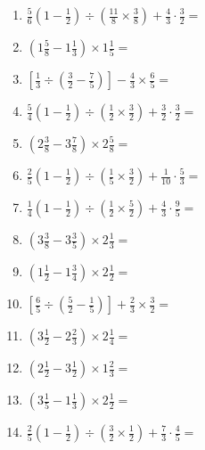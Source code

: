 \documentclass[12pt]{article}
\begin{document}
\begin{enumerate}[ itemsep=1.5cm]
	\item $\displaystyle \frac{5}{6} \left( 1 - \frac{1}{2} \right) \div \left( \frac{11}{8} \times \frac{3}{8} \right) + \frac{4}{3} \cdot \frac{3}{2} =$
	\item $\displaystyle \left( 1 \frac{5}{8} - 1 \frac{1}{3} \right) \times 1 \frac{1}{5} =$
	\item $\displaystyle \left[ \frac{1}{3} \div \left( \frac{3}{2} - \frac{7}{5} \right) \right] - \frac{4}{3} \times \frac{6}{5} =$
	\item $\displaystyle \frac{5}{4} \left( 1 - \frac{1}{2} \right) \div \left( \frac{1}{2} \times \frac{3}{2} \right) + \frac{3}{2} \cdot \frac{3}{2} =$
	\item $\displaystyle \left( 2 \frac{3}{8} - 3 \frac{7}{8} \right) \times 2 \frac{5}{8} =$
	\item $\displaystyle \frac{2}{5} \left( 1 - \frac{1}{2} \right) \div \left( \frac{1}{5} \times \frac{3}{2} \right) + \frac{1}{10} \cdot \frac{5}{3} =$
	\item $\displaystyle \frac{1}{4} \left( 1 - \frac{1}{2} \right) \div \left( \frac{1}{2} \times \frac{5}{2} \right) + \frac{4}{3} \cdot \frac{9}{5} =$
	\item $\displaystyle \left( 3 \frac{3}{8} - 3 \frac{3}{5} \right) \times 2 \frac{1}{3} =$
	\item $\displaystyle \left( 1 \frac{1}{2} - 1 \frac{3}{4} \right) \times 2 \frac{1}{2} =$

	\item $\displaystyle \left[ \frac{6}{5} \div \left( \frac{5}{2} - \frac{1}{5} \right) \right] + \frac{2}{3} \times \frac{3}{2} =$
	\item $\displaystyle \left( 3 \frac{1}{2} - 2 \frac{2}{3} \right) \times 2 \frac{1}{4} =$
	\item $\displaystyle \left( 2 \frac{1}{2} - 3 \frac{1}{2} \right) \times 1 \frac{2}{3} =$
	\item $\displaystyle \left( 3 \frac{1}{5} - 1 \frac{1}{3} \right) \times 2 \frac{1}{2} =$
	\item $\displaystyle \frac{2}{5} \left( 1 - \frac{1}{2} \right) \div \left( \frac{3}{2} \times \frac{1}{2} \right) + \frac{7}{3} \cdot \frac{4}{5} =$
\end{enumerate}
\end{document}
